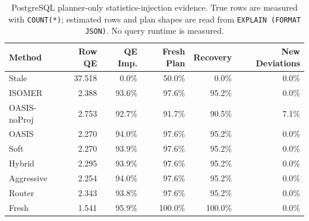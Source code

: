 \begin{table}[t]
  \centering
  \small
  \caption{PostgreSQL planner-only statistics-injection evidence. True rows are measured with \texttt{COUNT(*)}; estimated rows and plan shapes are read from \texttt{EXPLAIN (FORMAT JSON)}. No query runtime is measured.}
  \label{tab:postgres_planner_stats_injection}
  \setlength{\tabcolsep}{4pt}
  \begin{tabular}{lrrrrr}
    \toprule
    Method & Row QE & QE Imp. & Fresh Plan & Recovery & New Deviations \\
    \midrule
    Stale & 37.518 & 0.0\% & 50.0\% & 0.0\% & 0.0\% \\
    ISOMER & 2.388 & 93.6\% & 97.6\% & 95.2\% & 0.0\% \\
    OASIS-noProj & 2.753 & 92.7\% & 91.7\% & 90.5\% & 7.1\% \\
    OASIS & 2.270 & 94.0\% & 97.6\% & 95.2\% & 0.0\% \\
    Soft & 2.270 & 93.9\% & 97.6\% & 95.2\% & 0.0\% \\
    Hybrid & 2.295 & 93.9\% & 97.6\% & 95.2\% & 0.0\% \\
    Aggressive & 2.254 & 94.0\% & 97.6\% & 95.2\% & 0.0\% \\
    Router & 2.343 & 93.8\% & 97.6\% & 95.2\% & 0.0\% \\
    Fresh & 1.541 & 95.9\% & 100.0\% & 100.0\% & 0.0\% \\
    \bottomrule
  \end{tabular}
\end{table}
